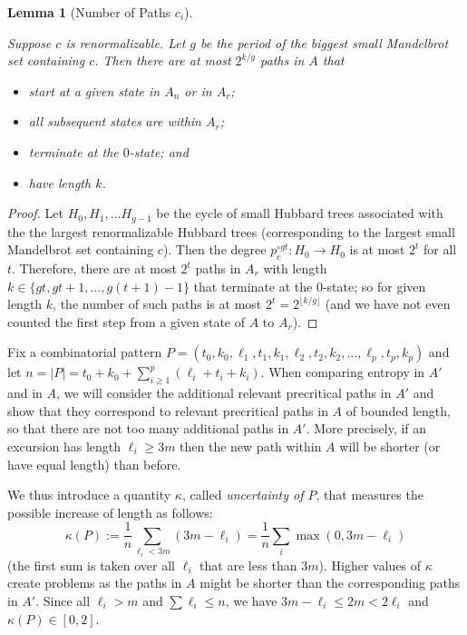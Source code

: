 \documentclass[12pt]{amsart}
\newcommand{\0}{\texttt{0}}
\newcommand{\1}{\texttt{1}}
\newtheorem{lemma}[theorem]{Lemma}
\theoremstyle{definition}
\numberwithin{equation}{section}
\newcommand{\lineclear}{\rule{0pt}{2pt}\newline}
\begin{document}
\begin{lemma}[Number of Paths $c_i$] 
\label{lem:c_iPaths} \lineclear
Suppose $c$ is renormalizable. Let $g$ be the period of the biggest small Mandelbrot set containing $c$. Then there are at most $2^{{k}/{g}}$ paths in $A$ that 
\begin{itemize}
\item start at a given state in $A_n$ or in $A_r$;
\item all subsequent states are within $A_r$;
\item terminate at the $0$-state; and
\item have length $k$.
\end{itemize}
\end{lemma}
\begin{proof}
Let $H_0,H_1,\dots H_{g-1}$ be the cycle of small Hubbard trees associated with the the largest renormalizable Hubbard trees (corresponding to the largest small Mandelbrot set containing $c$). Then the degree $p_c^{\circ gt}:H_{0}\to H_{0}$ is at most $2^t$ for all $t$. Therefore, there are at most $2^{t}$ paths in $A_r$ with length $k\in \{ gt,gt+1,\dots, g(t+1)-1\}$ that terminate at the $0$-state; so for given length $k$, the number of such paths is at most $2^t=2^{\lfloor k/g \rfloor}$ (and we have not even counted the first step from a given state of $A$ to $A_r$). 
\end{proof}


Fix a combinatorial pattern $P=(t_0,k_0,\ell_1,t_1,k_1,\ell_2,t_2,k_2,\dots,\ell_p,t_p,k_p)$ and let $n=|P|=t_0+k_0+\sum_{i\ge 1}^p(\ell_i+t_i+k_i)$. 
When comparing entropy in $A'$ and in $A$, we will consider the additional relevant precritical paths in $A'$ and show that they correspond to relevant precritical paths in $A$ of bounded length, so that there are not too many additional paths in $A'$. More precisely, if an excursion has length $\ell_i\ge 3m$ then the new path within $A$ will be shorter (or have equal length) than before. 

We thus introduce a quantity $\kappa$, called \emph{uncertainty of $P$}, that measures the possible increase of length as follows:
\[
\kappa(P):= \frac 1 n \sum_{\ell_i<3m}(3m- \ell_{i})
= \frac 1 n  \sum_i  \max(0,3m-\ell_i)
\]
(the first sum is taken over all $\ell_i$ that are less than $3m$). Higher values of $\kappa$ create problems as the paths in $A$ might be shorter than the corresponding paths in $A'$. Since all $\ell_i>m$ and $\sum\ell_i\le n$, we have $3m-\ell_i\le 2m < 2\ell_i$ and $\kappa(P)\in[0, 2]$.
\end{document}
